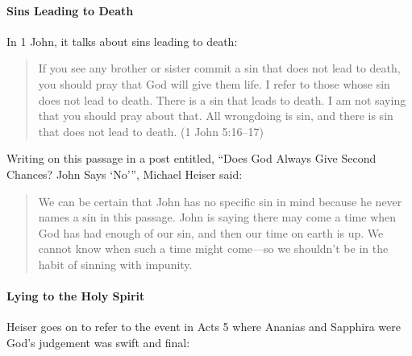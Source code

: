 \paragraph{Sins Leading to Death} In 1 John, it talks about sins leading to
death:

\begin{quote}
    If you see any brother or sister commit a sin that does not lead to death,
    you should pray that God will give them life. I refer to those whose sin
    does not lead to death. There is a sin that leads to death. I am not saying
    that you should pray about that. All wrongdoing is sin, and there is sin
    that does not lead to death. (1 John 5:16--17)
\end{quote}

Writing on this passage in a post entitled, \enquote{Does God Always Give Second
Chances? John Says \enquote{No}}, Michael Heiser said:

\begin{quote}
    We can be certain that John has no specific sin in mind because he never
    names a sin in this passage. John is saying there may come a time when God
    has had enough of our sin, and then our time on earth is up. We cannot know
    when such a time might come---so we shouldn't be in the habit of sinning
    with impunity.
    \autocite{heiser:2019}
\end{quote}

\paragraph{Lying to the Holy Spirit} Heiser goes on to refer to the event in
Acts 5 where Ananias and Sapphira were God's judgement was swift and final:

